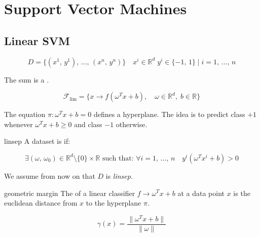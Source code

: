 \chapter[SVMs]{Support Vector Machines}

\section{Linear SVM}
\label{sec:linear-svm}

\begin{equation*}
	D = \{ (x^1,\, y^1),\, \dots,\, (x^n,\, y^n) \} \quad  x^i \in \mathds{R}^d \; y^i \in \{-1,\, 1\} \mid i = 1,\, \dots,\, n
\end{equation*}

The sum is a .

\begin{equation}
	\mathcal{F}_{\text{lim}} = \{x \to f\left(\omega^Tx + b\right),\quad \omega \in \mathds{R}^d, \; b \in \mathds{R} \}
\end{equation}

The equation $\pi : \omega^Tx + b = 0$ defines a hyperplane.
The idea is to predict class $+1$ whenever $\omega^Tx + b \geq 0$ and class $-1$ otherwise.

\begin{definition}{linsep}{}
	A dataset is  if:

	\begin{equation*}
		\exists (\omega,\, \omega_0) \in \mathds{R}^d \setminus \{0\} \times \mathds{R}
		\text{ such that: }
		\forall i=1,\,\dots,\,n\quad y^i(\omega^Tx^i +b) > 0
	\end{equation*}
\end{definition}

We assume from now on that $D$ is \emph{linsep}.

\begin{definition}{geometric margin}{}
	The  of a linear
	classifier $f \to \omega^Tx + b$ at a data point $x$ is the
	euclidean distance from $x$ to the hyperplane $\pi$.

	\begin{equation*}
		\gamma(x) = \frac{\lVert\omega^Tx + b\rVert}{\lVert\omega\rVert} \tag{geometric margin}
	\end{equation*}
\end{definition}

